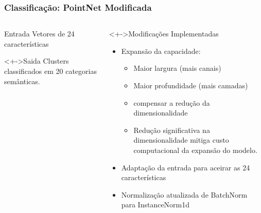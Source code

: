 \documentclass[aspectratio=169,t,xcolor=table]{beamer}
\begin{document}
\begin{frame}
    \frametitle{Classificação: PointNet Modificada}
    \begin{columns}[T]
        \begin{column}{.4\textwidth}
            \begin{block}{Entrada}
                \vspace{0.5em}
                Vetores de 24 características
                \vspace{0.5em}
            \end{block}
            \begin{block}<+->{Saida}
                \vspace{0.5em}
                Clusters classificados em 20 categorias semânticas.
                \vspace{0.5em}
            \end{block}
        \end{column}
        \begin{column}{.6\textwidth}
            \begin{block}<+->{Modificações Implementadas}
                \begin{itemize}[<+->]
                    \item Expansão da capacidade:
                          \begin{itemize}
                              \item Maior largura (mais canais)
                              \item Maior profundidade (mais camadas)
                              \item compensar a redução da dimensionalidade
                              \item Redução significativa na dimensionalidade
                                    mitiga custo computacional da expansão do
                                    modelo.
                          \end{itemize}
                    \item Adaptação da entrada para aceirar as 24 características
                    \item Normalização atualizada de BatchNorm para InstanceNorm1d
                \end{itemize}
            \end{block}
        \end{column}
    \end{columns}
\end{frame}
\end{document}
